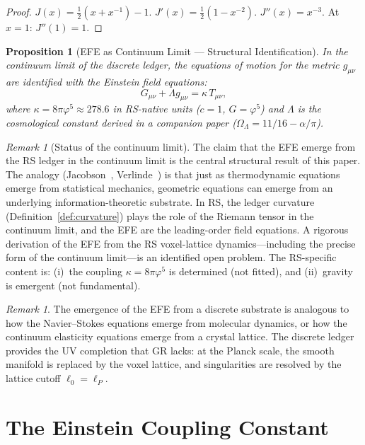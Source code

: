 \documentclass[12pt,a4paper]{article}
\newtheorem{proposition}[theorem]{Proposition}
\theoremstyle{definition}
\theoremstyle{remark}
\newtheorem{remark}[theorem]{Remark}
\begin{document}
\begin{proof}
$J(x) = \frac{1}{2}(x + x^{-1}) - 1$.
$J'(x) = \frac{1}{2}(1 - x^{-2})$.
$J''(x) = x^{-3}$.  At $x = 1$: $J''(1) = 1$.
\end{proof}

\begin{proposition}[EFE as Continuum Limit --- Structural Identification]
\label{thm:efe}
In the continuum limit of the discrete ledger, the equations
of motion for the metric $g_{\mu\nu}$ are identified with the Einstein field
equations:
\begin{equation}
  \boxed{G_{\mu\nu} + \Lambda g_{\mu\nu}
  = \kappa\, T_{\mu\nu},}
\end{equation}
where $\kappa = 8\pi\varphi^5 \approx 278.6$ in RS-native
units ($c = 1$, $G = \varphi^5$) and $\Lambda$ is the cosmological
constant derived in a companion paper ($\Omega_\Lambda = 11/16 - \alpha/\pi$).
\end{proposition}

\begin{remark}[Status of the continuum limit]
The claim that the EFE emerge from the RS ledger in the continuum
limit is the central structural result of this paper.  The analogy
(Jacobson~\cite{Jacobson1995}, Verlinde~\cite{Verlinde2011}) is that
just as thermodynamic equations emerge from statistical mechanics,
geometric equations can emerge from an underlying information-theoretic
substrate.  In RS, the ledger curvature (Definition~\ref{def:curvature})
plays the role of the Riemann tensor in the continuum limit, and the
EFE are the leading-order field equations.  A rigorous derivation of
the EFE from the RS voxel-lattice dynamics---including the precise
form of the continuum limit---is an identified open problem.  The
RS-specific content is: (i)~the coupling $\kappa = 8\pi\varphi^5$ is
determined (not fitted), and (ii)~gravity is emergent (not fundamental).
\end{remark}

\begin{remark}
The emergence of the EFE from a discrete substrate is
analogous to how the Navier--Stokes equations emerge from
molecular dynamics, or how the continuum elasticity equations
emerge from a crystal lattice.  The discrete ledger provides
the UV completion that GR lacks: at the Planck scale, the
smooth manifold is replaced by the voxel lattice, and
singularities are resolved by the lattice cutoff
$\ell_0 = \ell_P$.
\end{remark}

\section{The Einstein Coupling Constant}
\label{sec:kappa}
\end{document}
